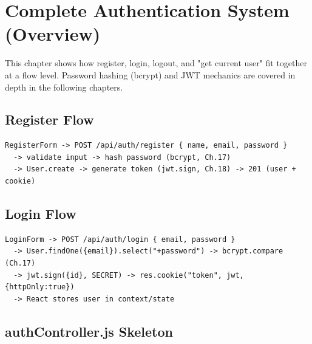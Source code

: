 \chapter{Complete Authentication System (Overview)}

This chapter shows how register, login, logout, and "get current user" fit
together at a flow level. Password hashing (bcrypt) and JWT mechanics are
covered in depth in the following chapters.

\section{Register Flow}

\begin{diagrambox}
\begin{verbatim}
RegisterForm -> POST /api/auth/register { name, email, password }
  -> validate input -> hash password (bcrypt, Ch.17)
  -> User.create -> generate token (jwt.sign, Ch.18) -> 201 (user + cookie)
\end{verbatim}
\end{diagrambox}

\section{Login Flow}

\begin{diagrambox}
\begin{verbatim}
LoginForm -> POST /api/auth/login { email, password }
  -> User.findOne({email}).select("+password") -> bcrypt.compare (Ch.17)
  -> jwt.sign({id}, SECRET) -> res.cookie("token", jwt, {httpOnly:true})
  -> React stores user in context/state
\end{verbatim}
\end{diagrambox}

\section{authController.js Skeleton}

